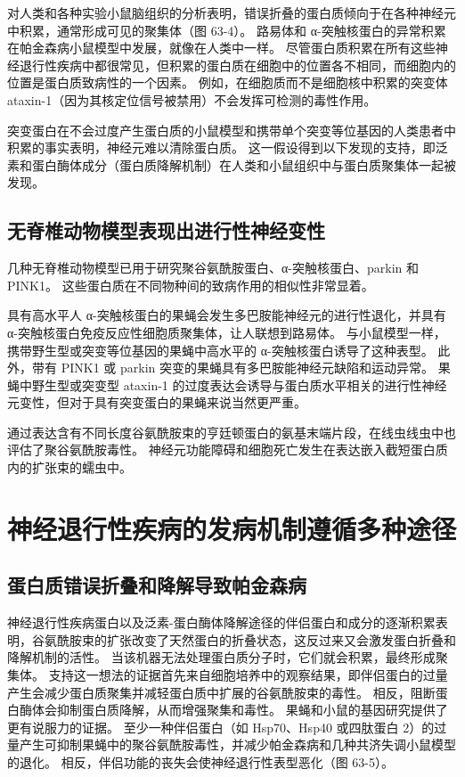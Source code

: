 对人类和各种实验小鼠脑组织的分析表明，错误折叠的蛋白质倾向于在各种神经元中积累，通常形成可见的聚集体（图 63-4）。 路易体和 α-突触核蛋白的异常积累在帕金森病小鼠模型中发展，就像在人类中一样。 尽管蛋白质积累在所有这些神经退行性疾病中都很常见，但积累的蛋白质在细胞中的位置各不相同，而细胞内的位置是蛋白质致病性的一个因素。 例如，在细胞质而不是细胞核中积累的突变体 ataxin-1（因为其核定位信号被禁用）不会发挥可检测的毒性作用。

突变蛋白在不会过度产生蛋白质的小鼠模型和携带单个突变等位基因的人类患者中积累的事实表明，神经元难以清除蛋白质。 这一假设得到以下发现的支持，即泛素和蛋白酶体成分（蛋白质降解机制）在人类和小鼠组织中与蛋白质聚集体一起被发现。

\subsection{无脊椎动物模型表现出进行性神经变性}

几种无脊椎动物模型已用于研究聚谷氨酰胺蛋白、α-突触核蛋白、parkin 和 PINK1。 这些蛋白质在不同物种间的致病作用的相似性非常显着。

具有高水平人 α-突触核蛋白的果蝇会发生多巴胺能神经元的进行性退化，并具有 α-突触核蛋白免疫反应性细胞质聚集体，让人联想到路易体。 与小鼠模型一样，携带野生型或突变等位基因的果蝇中高水平的 α-突触核蛋白诱导了这种表型。 此外，带有 PINK1 或 parkin 突变的果蝇具有多巴胺能神经元缺陷和运动异常。 果蝇中野生型或突变型 ataxin-1 的过度表达会诱导与蛋白质水平相关的进行性神经元变性，但对于具有突变蛋白的果蝇来说当然更严重。

通过表达含有不同长度谷氨酰胺束的亨廷顿蛋白的氨基末端片段，在线虫线虫中也评估了聚谷氨酰胺毒性。 神经元功能障碍和细胞死亡发生在表达嵌入截短蛋白质内的扩张束的蠕虫中。

\section{神经退行性疾病的发病机制遵循多种途径}
\subsection{蛋白质错误折叠和降解导致帕金森病}
神经退行性疾病蛋白以及泛素-蛋白酶体降解途径的伴侣蛋白和成分的逐渐积累表明，谷氨酰胺束的扩张改变了天然蛋白的折叠状态，这反过来又会激发蛋白折叠和降解机制的活性。 当该机器无法处理蛋白质分子时，它们就会积累，最终形成聚集体。 支持这一想法的证据首先来自细胞培养中的观察结果，即伴侣蛋白的过量产生会减少蛋白质聚集并减轻蛋白质中扩展的谷氨酰胺束的毒性。 相反，阻断蛋白酶体会抑制蛋白质降解，从而增强聚集和毒性。 果蝇和小鼠的基因研究提供了更有说服力的证据。 至少一种伴侣蛋白（如 Hsp70、Hsp40 或四肽蛋白 2）的过量产生可抑制果蝇中的聚谷氨酰胺毒性，并减少帕金森病和几种共济失调小鼠模型的退化。 相反，伴侣功能的丧失会使神经退行性表型恶化（图 63-5）。

